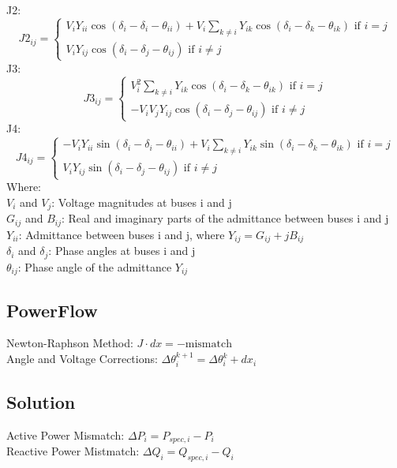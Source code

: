 \documentclass{article}
\begin{document}
	
	\noindent
	J2:
	\begin{equation}
		J2_{ij} = 
		\begin{cases}
			V_i Y_{ii} \cos(\delta_i - \delta_i - \theta_{ii}) + V_i \sum_{k \neq i} Y_{ik} \cos(\delta_i - \delta_k - \theta_{ik}) \text{ if } i = j \\
			V_i Y_{ij} \cos(\delta_i - \delta_j - \theta_{ij}) \text{ if } i \neq j
		\end{cases}
	\end{equation}
	J3: 
	\begin{equation}
		J3_{ij} = 
		\begin{cases}
			V_i^2 \sum_{k \neq i} Y_{ik} \cos(\delta_i - \delta_k - \theta_{ik}) \text{ if } i = j \\
			-V_i V_j Y_{ij} \cos(\delta_i - \delta_j - \theta_{ij}) \text{ if } i \neq j
		\end{cases}
	\end{equation}
	J4: 
	\begin{equation}
		J4_{ij} = 
		\begin{cases}
			-V_i Y_{ii} \sin(\delta_i - \delta_i - \theta_{ii}) + V_i \sum_{k \neq i} Y_{ik} \sin(\delta_i - \delta_k - \theta_{ik}) \text{ if } i = j \\
			V_i Y_{ij} \sin(\delta_i - \delta_j - \theta_{ij}) \text{ if } i \neq j
		\end{cases}
	\end{equation}
	Where: \\
	$V_i$ and $V_j$: Voltage magnitudes at buses i and j \\
	$G_{ij}$ and $B_{ij}$: Real and imaginary parts of the admittance between buses i and j \\
	$Y_{ii}$: Admittance between buses i and j, where $Y_{ij} = G_{ij} + j B_{ij}$ \\
	$\delta_i$ and $\delta_j$: Phase angles at buses i and j \\
	$\theta_{ij}$: Phase angle of the admittance $Y_{ij}$
	
	\subsection{PowerFlow}
	Newton-Raphson Method: $J \cdot dx = -\text{mismatch}$ \\
	Angle and Voltage Corrections: $\Delta \theta_{i}^{k+1} = \Delta \theta_i^k + dx_i$
	
	\subsection{Solution}
	Active Power Mismatch: $\Delta P_i = P_{spec,i} - P_i$ \\
	Reactive Power Mistmatch: $\Delta Q_i = Q_{spec,i} - Q_i$
	
\end{document}

